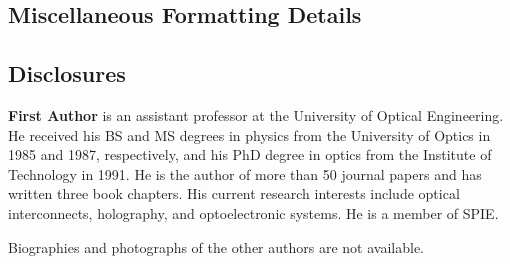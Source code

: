 \documentclass[12pt]{spieman}  %
\begin{document}
\begin{spacing}{2}
\appendix    %

\section{Miscellaneous Formatting Details}
\label{sect:misc}


\subsection*{Disclosures}


\acknowledgments 





\vspace{2ex}\noindent\textbf{First Author} is an assistant professor at the University of Optical Engineering. He received his BS and MS degrees in physics from the University of Optics in 1985 and 1987, respectively, and his PhD degree in optics from the Institute of Technology in 1991.  He is the author of more than 50 journal papers and has written three book chapters. His current research interests include optical interconnects, holography, and optoelectronic systems. He is a member of SPIE.

\vspace{1ex}
\noindent Biographies and photographs of the other authors are not available.

\listoffigures
\listoftables

\end{spacing}
\end{document}

